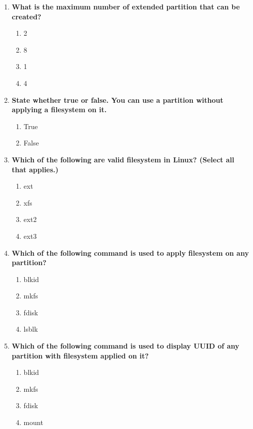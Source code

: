 \begin{flushleft}
\begin{enumerate}
		\item \textbf{What is the maximum number of extended partition that can be created?}
		\begin{enumerate}[label=(\alph*)]
			\item 2
			\item 8
			\item 1  %
			\item 4 
		\end{enumerate}
		\bigskip
		\bigskip	

		\item \textbf{State whether true or false. You can use a partition without applying a filesystem on it.}
		\begin{enumerate}[label=(\alph*)]
			\item True    
			\item False     %
		\end{enumerate}
		\bigskip
		\bigskip
		
		
		\item \textbf{Which of the following are valid filesystem in Linux? (Select all that applies.)}
		\begin{enumerate}[label=(\alph*)]
			\item ext  %
			\item xfs  %
			\item ext2 %
			\item ext3  %
		\end{enumerate}
		\bigskip
		\bigskip	

		\item \textbf{Which of the following command is used to apply filesystem on any partition?}
		\begin{enumerate}[label=(\alph*)]
			\item blkid
			\item mkfs  %
			\item fdisk
			\item lsblk
		\end{enumerate}
		\bigskip
		\bigskip	


		\item \textbf{Which of the following command is used to display UUID of any partition with filesystem applied on it?}
		\begin{enumerate}[label=(\alph*)]
			\item blkid  %
			\item mkfs  
			\item fdisk
			\item mount
		\end{enumerate}
		\bigskip
		\bigskip	



\end{enumerate}
\end{flushleft}
